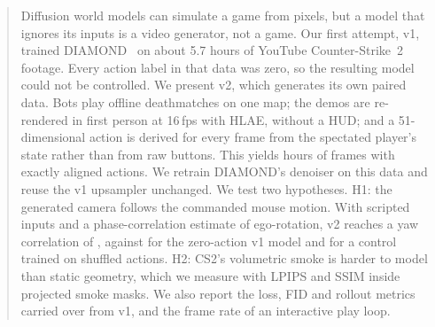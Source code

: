 \begin{abstract}
Diffusion world models can simulate a game from pixels, but a model that ignores its inputs is a video generator, not a game.
Our first attempt, v1, trained DIAMOND~\cite{alonso2024diamond} on about 5.7 hours of YouTube Counter-Strike~2 footage.
Every action label in that data was zero, so the resulting model could not be controlled.
We present v2, which generates its own paired data.
Bots play offline deathmatches on one map; the demos are re-rendered in first person at 16\,fps with HLAE, without a HUD;
and a 51-dimensional action is derived for every frame from the spectated player's state rather than from raw buttons.
This yields \TBDhours hours of frames with exactly aligned actions.
We retrain DIAMOND's denoiser on this data and reuse the v1 upsampler unchanged.
We test two hypotheses.
H1: the generated camera follows the commanded mouse motion.
With scripted inputs and a phase-correlation estimate of ego-rotation, v2 reaches a yaw correlation of \TBDhOneRvTwo,
against \TBDhOneRvOne for the zero-action v1 model and \TBDhOneRshuf for a control trained on shuffled actions.
H2: CS2's volumetric smoke is harder to model than static geometry, which we measure with LPIPS and SSIM inside projected smoke masks.
We also report the loss, FID and rollout metrics carried over from v1, and the frame rate of an interactive play loop.
\end{abstract}
